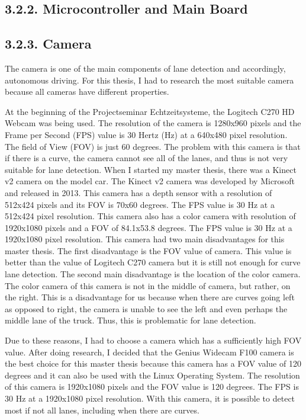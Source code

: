 \subsection*{3.2.2. Microcontroller and Main Board}\label{sec:Microcontroller and Main Board}
%

\subsection*{3.2.3. Camera}\label{sec:Camera}

The camera is one of the main components of lane detection and accordingly, autonomous driving. For this thesis, I had 
to research the most suitable camera because all cameras have different properties.

At the beginning of the Projectseminar Echtzeitsysteme, the Logitech C270 HD Webcam was being used. The resolution of 
the camera is 1280x960 pixels and the Frame per Second (FPS) value is 30 Hertz (Hz) at a 640x480 pixel resolution. 
The field of View (FOV) is just 60 degrees. The problem with this camera is that if there is a curve, the camera 
cannot see all of the lanes, and thus is not very suitable for lane detection. When I started my master thesis, there 
was a Kinect v2 camera on the model car.  The Kinect v2 camera was developed by Microsoft and released in 2013. This 
camera has a depth sensor with a resolution of 512x424 pixels and its FOV is 70x60 degrees. The FPS value is 30 Hz at 
a 512x424 pixel resolution. This camera also has a color camera with resolution of 1920x1080 pixels and a FOV of 
84.1x53.8 degrees. The FPS value is 30 Hz at a 1920x1080 pixel resolution. This camera had two main disadvantages for 
this master thesis. The first disadvantage is the FOV value of camera. This value is better than the value of Logitech 
C270 camera but it is still not enough for curve lane detection. The second main disadvantage is the location of the 
color camera. The color camera of this camera is not in the middle of camera, but rather, on the right. This is a 
disadvantage for us because when there are curves going left as opposed to right, the camera is unable to see the 
left and even perhaps the middle lane of the truck. Thus, this is problematic for lane detection.

Due to these reasons, I had to choose a camera which has a sufficiently high FOV value. After doing research, I decided 
that the Genius Widecam F100 camera is the best choice for this master thesis because this camera has a FOV value of 
120 degrees and it can also be used with the Linux Operating System. The resolution of this camera is 1920x1080 pixels 
and the FOV value is 120 degrees. The FPS is 30 Hz at a 1920x1080 pixel resolution. With this camera, it is possible 
to detect most if not all lanes, including when there are curves. 

